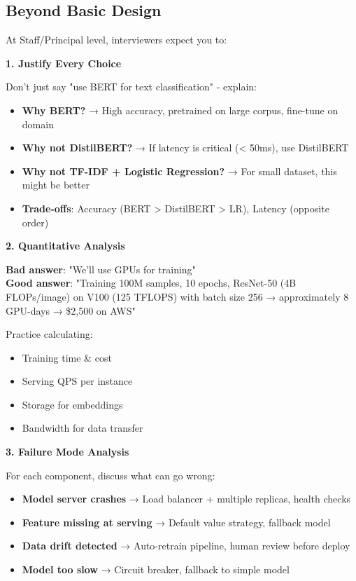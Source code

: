 \documentclass[10pt]{article}
\begin{document}
\subsection{Beyond Basic Design}

At Staff/Principal level, interviewers expect you to:

\textbf{1. Justify Every Choice}

Don't just say "use BERT for text classification" - explain:
\begin{itemize}
\item \textbf{Why BERT?} → High accuracy, pretrained on large corpus, fine-tune on domain
\item \textbf{Why not DistilBERT?} → If latency is critical (< 50ms), use DistilBERT
\item \textbf{Why not TF-IDF + Logistic Regression?} → For small dataset, this might be better
\item \textbf{Trade-offs}: Accuracy (BERT > DistilBERT > LR), Latency (opposite order)
\end{itemize}

\textbf{2. Quantitative Analysis}

\textbf{Bad answer}: "We'll use GPUs for training" \\
\textbf{Good answer}: "Training 100M samples, 10 epochs, ResNet-50 (4B FLOPs/image) on V100 (125 TFLOPS) with batch size 256 → approximately 8 GPU-days → \$2,500 on AWS"

Practice calculating:
\begin{itemize}
\item Training time \& cost
\item Serving QPS per instance
\item Storage for embeddings
\item Bandwidth for data transfer
\end{itemize}

\textbf{3. Failure Mode Analysis}

For each component, discuss what can go wrong:
\begin{itemize}
\item \textbf{Model server crashes} → Load balancer + multiple replicas, health checks
\item \textbf{Feature missing at serving} → Default value strategy, fallback model
\item \textbf{Data drift detected} → Auto-retrain pipeline, human review before deploy
\item \textbf{Model too slow} → Circuit breaker, fallback to simple model
\end{itemize}
\end{document}
